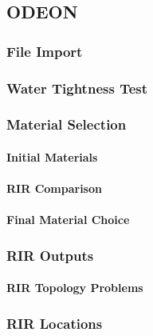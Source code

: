 \documentclass[../../main.tex]{subfiles}
\begin{document}
\subsection{ODEON}
	\subsubsection{File Import}

	\subsubsection{Water Tightness Test}

	\subsubsection{Material Selection}
	
		\paragraph{Initial Materials}

		\paragraph{RIR Comparison}

		\paragraph{Final Material Choice}

	\subsubsection{RIR Outputs}

		\paragraph{RIR Topology Problems}




	\subsubsection{RIR Locations}
	
\end{document}
